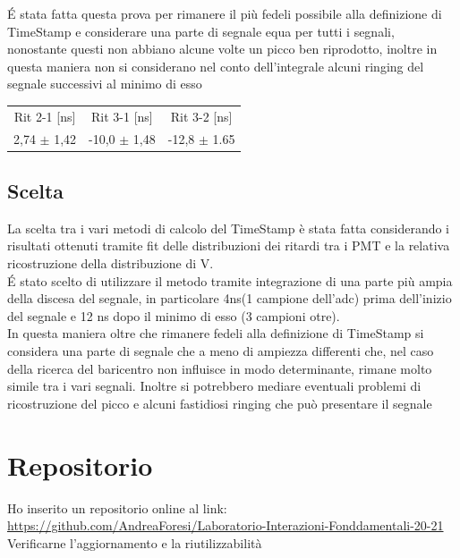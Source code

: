 \documentclass[a4paper]{article}
\begin{document}
\'E stata fatta questa prova per rimanere il più fedeli possibile alla definizione di TimeStamp e considerare una parte di segnale equa per tutti i segnali, nonostante questi non abbiano alcune volte un picco ben riprodotto, inoltre in questa maniera non si considerano nel conto dell'integrale alcuni ringing del segnale successivi al minimo di esso 

\begin{tabular}{c|c|c}
Rit 2-1 [ns] & Rit 3-1 [ns] & Rit 3-2 [ns] \\
\hfill
2,74 $\pm$ 1,42 & -10,0 $\pm$ 1,48 & -12,8 $\pm$ 1.65
\hfill
\label{tab:RitForeA}
\end{tabular}



\subsection{Scelta}
\label{secA:Scelta}
La scelta tra i vari metodi di calcolo del TimeStamp è stata fatta considerando i risultati ottenuti tramite fit delle distribuzioni dei ritardi tra i PMT e la relativa ricostruzione della distribuzione di V.\\
\'E stato scelto di utilizzare il metodo tramite integrazione di una parte più ampia della discesa del segnale, in particolare 4ns(1 campione dell'adc) prima dell'inizio del segnale e 12 ns dopo il minimo di esso (3 campioni otre).\\
In questa maniera oltre che rimanere fedeli alla definizione di TimeStamp si considera una parte di segnale che a meno di ampiezza differenti che, nel caso della ricerca del baricentro non influisce in modo determinante, rimane molto simile tra i vari segnali. Inoltre si potrebbero mediare eventuali problemi di ricostruzione del picco e alcuni fastidiosi ringing che può presentare il segnale

\section{Repositorio}
Ho inserito un repositorio online al link:\\
\url{https://github.com/AndreaForesi/Laboratorio-Interazioni-Fonddamentali-20-21}\\
Verificarne l'aggiornamento e la riutilizzabilità
\end{document}
